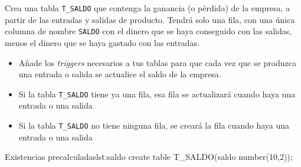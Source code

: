 \begin{homeworkProblem}

  Crea una tabla \texttt{T\_SALDO} que contenga la ganancia (o pérdida) de la empresa, a partir de las entradas y salidas de producto. Tendrá solo una fila, con una única columna de nombre \texttt{SALDO} con el dinero que se haya conseguido con las salidas, menos el dinero que se haya gastado con las entradas.
  
  \begin{itemize}
  \item Añade los \textit{triggers} necesarios a tus tablas para que cada vez que se produzca una entrada o salida se actualice el saldo de la empresa.
  \item Si la tabla \texttt{T\_SALDO} tiene ya una fila, esa fila se actualizará cuando haya una entrada o una salida
  \item Si la tabla \texttt{T\_SALDO} no tiene ninguna fila, se creará la fila cuando haya una entrada o una salida
  \end{itemize}

  
\begin{listadosql}{Existencias precalculadas}{lst:saldo}
create table T_SALDO(saldo number(10,2));
\end{listadosql}

\end{homeworkProblem}


